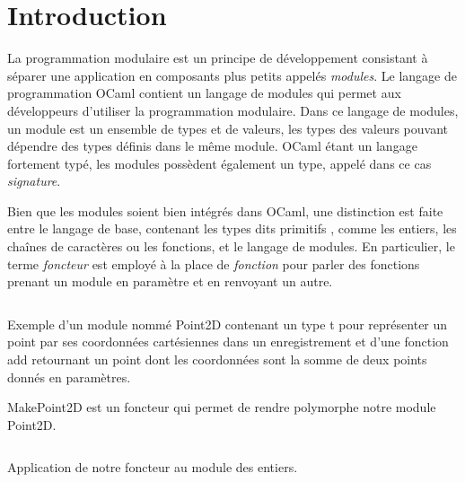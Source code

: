 \chapter*{Introduction}

La programmation modulaire est un principe de développement consistant à séparer une application en composants plus petits appelés \textit{modules}. Le langage de
programmation OCaml contient un langage de modules qui permet aux développeurs
d'utiliser la programmation modulaire. Dans ce langage de modules, un module est
un ensemble de types et de valeurs, les types des valeurs pouvant dépendre des
types définis dans le même module.
OCaml étant un langage fortement typé, les modules possèdent également
un type, appelé dans ce cas \textit{signature}.


Bien que les modules soient bien intégrés dans OCaml, une
distinction est faite entre le langage de base, contenant les types dits
\og primitifs \fg, comme les entiers, les chaînes de caractères ou les fonctions, et le
langage de modules. En particulier, le terme \textit{foncteur} est employé à la
place de \textit{fonction} pour parler des fonctions prenant un module en
paramètre et en renvoyant un autre.

\renewcommand\listingscaption{Code OCaml}

\begin{listing}
  \inputminted{OCaml}{codes/intro_point2D.ml}
  \caption{Exemple d'un module nommé Point2D contenant un type t pour
    représenter un point par ses coordonnées cartésiennes dans un enregistrement
    et d'une fonction add retournant un point dont les coordonnées sont
    la somme de deux points donnés en paramètres.}
\end{listing}

\begin{listing}
  \caption{MakePoint2D est un foncteur qui permet de rendre polymorphe notre
    module Point2D.}
  \inputminted{OCaml}{codes/intro_point2D_polymorphic.ml}
\end{listing}

\begin{listing}
  \caption{Application de notre foncteur au module des entiers.}
  \inputminted{OCaml}{codes/intro_point2D_polymorphic_app.ml}
\end{listing}

